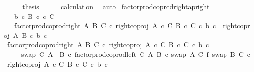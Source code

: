 \begin{isabellebody}
\ \ \isamarkupfalse%
\ \isamarkupfalse%
\ {\isacharquery}{\kern0pt}thesis\isanewline
\ \ \ \ \isamarkupfalse%
\ calculation\ \isamarkupfalse%
\ auto\isanewline
{}\isamarkupfalse%
%
\endisatagproof
{\isafoldproof}%
%
\isadelimproof
\isanewline
%
\endisadelimproof
\isanewline
{}\isamarkupfalse%
\ factor{\isacharunderscore}{\kern0pt}prod{\isacharunderscore}{\kern0pt}coprod{\isacharunderscore}{\kern0pt}right{\isacharunderscore}{\kern0pt}ap{\isacharunderscore}{\kern0pt}right{\isacharcolon}{\kern0pt}\isanewline
\ \ \ {\isachardoublequoteopen}b\ {\isasymin}\isactrlsub c\ B{\isachardoublequoteclose}\ {\isachardoublequoteopen}c\ {\isasymin}\isactrlsub c\ C{\isachardoublequoteclose}\isanewline
\ \ \ {\isachardoublequoteopen}factor{\isacharunderscore}{\kern0pt}prod{\isacharunderscore}{\kern0pt}coprod{\isacharunderscore}{\kern0pt}right\ A\ B\ C\ {\isasymcirc}\isactrlsub c\ right{\isacharunderscore}{\kern0pt}coproj\ {\isacharparenleft}{\kern0pt}A\ {\isasymtimes}\isactrlsub c\ C{\isacharparenright}{\kern0pt}\ {\isacharparenleft}{\kern0pt}B\ {\isasymtimes}\isactrlsub c\ C{\isacharparenright}{\kern0pt}\ {\isasymcirc}\isactrlsub c\ {\isasymlangle}b{\isacharcomma}{\kern0pt}\ c{\isasymrangle}\ {\isacharequal}{\kern0pt}\ {\isasymlangle}right{\isacharunderscore}{\kern0pt}coproj\ A\ B\ {\isasymcirc}\isactrlsub c\ b{\isacharcomma}{\kern0pt}\ c{\isasymrangle}{\isachardoublequoteclose}\isanewline
%
\isadelimproof
%
\endisadelimproof
%
\isatagproof
{}\isamarkupfalse%
\ {\isacharminus}{\kern0pt}\isanewline
\ \ \isamarkupfalse%
\ {\isachardoublequoteopen}factor{\isacharunderscore}{\kern0pt}prod{\isacharunderscore}{\kern0pt}coprod{\isacharunderscore}{\kern0pt}right\ A\ B\ C\ {\isasymcirc}\isactrlsub c\ right{\isacharunderscore}{\kern0pt}coproj\ {\isacharparenleft}{\kern0pt}A\ {\isasymtimes}\isactrlsub c\ C{\isacharparenright}{\kern0pt}\ {\isacharparenleft}{\kern0pt}B\ {\isasymtimes}\isactrlsub c\ C{\isacharparenright}{\kern0pt}\ {\isasymcirc}\isactrlsub c\ {\isasymlangle}b{\isacharcomma}{\kern0pt}\ c{\isasymrangle}\isanewline
\ \ \ \ {\isacharequal}{\kern0pt}\ {\isacharparenleft}{\kern0pt}swap\ C\ {\isacharparenleft}{\kern0pt}A\ {\isasymCoprod}\ B{\isacharparenright}{\kern0pt}\ {\isasymcirc}\isactrlsub c\ factor{\isacharunderscore}{\kern0pt}prod{\isacharunderscore}{\kern0pt}coprod{\isacharunderscore}{\kern0pt}left\ C\ A\ B\ {\isasymcirc}\isactrlsub c\ {\isacharparenleft}{\kern0pt}swap\ A\ C\ {\isasymbowtie}\isactrlsub f\ swap\ B\ C{\isacharparenright}{\kern0pt}{\isacharparenright}{\kern0pt}\ {\isasymcirc}\isactrlsub c\ {\isacharparenleft}{\kern0pt}right{\isacharunderscore}{\kern0pt}coproj\ {\isacharparenleft}{\kern0pt}A\ {\isasymtimes}\isactrlsub c\ C{\isacharparenright}{\kern0pt}\ {\isacharparenleft}{\kern0pt}B\ {\isasymtimes}\isactrlsub c\ C{\isacharparenright}{\kern0pt}\ {\isasymcirc}\isactrlsub c\ {\isasymlangle}b{\isacharcomma}{\kern0pt}\ c{\isasymrangle}{\isacharparenright}{\kern0pt}{\isachardoublequoteclose}\isanewline

\end{isabellebody}

